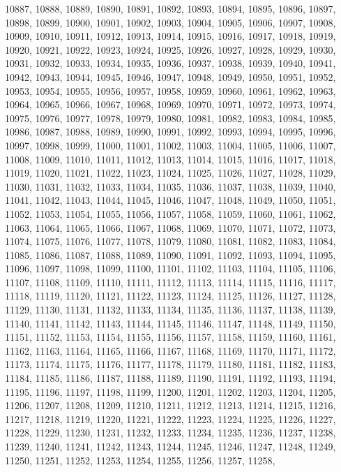 10887,
10888,
10889,
10890,
10891,
10892,
10893,
10894,
10895,
10896,
10897,
10898,
10899,
10900,
10901,
10902,
10903,
10904,
10905,
10906,
10907,
10908,
10909,
10910,
10911,
10912,
10913,
10914,
10915,
10916,
10917,
10918,
10919,
10920,
10921,
10922,
10923,
10924,
10925,
10926,
10927,
10928,
10929,
10930,
10931,
10932,
10933,
10934,
10935,
10936,
10937,
10938,
10939,
10940,
10941,
10942,
10943,
10944,
10945,
10946,
10947,
10948,
10949,
10950,
10951,
10952,
10953,
10954,
10955,
10956,
10957,
10958,
10959,
10960,
10961,
10962,
10963,
10964,
10965,
10966,
10967,
10968,
10969,
10970,
10971,
10972,
10973,
10974,
10975,
10976,
10977,
10978,
10979,
10980,
10981,
10982,
10983,
10984,
10985,
10986,
10987,
10988,
10989,
10990,
10991,
10992,
10993,
10994,
10995,
10996,
10997,
10998,
10999,
11000,
11001,
11002,
11003,
11004,
11005,
11006,
11007,
11008,
11009,
11010,
11011,
11012,
11013,
11014,
11015,
11016,
11017,
11018,
11019,
11020,
11021,
11022,
11023,
11024,
11025,
11026,
11027,
11028,
11029,
11030,
11031,
11032,
11033,
11034,
11035,
11036,
11037,
11038,
11039,
11040,
11041,
11042,
11043,
11044,
11045,
11046,
11047,
11048,
11049,
11050,
11051,
11052,
11053,
11054,
11055,
11056,
11057,
11058,
11059,
11060,
11061,
11062,
11063,
11064,
11065,
11066,
11067,
11068,
11069,
11070,
11071,
11072,
11073,
11074,
11075,
11076,
11077,
11078,
11079,
11080,
11081,
11082,
11083,
11084,
11085,
11086,
11087,
11088,
11089,
11090,
11091,
11092,
11093,
11094,
11095,
11096,
11097,
11098,
11099,
11100,
11101,
11102,
11103,
11104,
11105,
11106,
11107,
11108,
11109,
11110,
11111,
11112,
11113,
11114,
11115,
11116,
11117,
11118,
11119,
11120,
11121,
11122,
11123,
11124,
11125,
11126,
11127,
11128,
11129,
11130,
11131,
11132,
11133,
11134,
11135,
11136,
11137,
11138,
11139,
11140,
11141,
11142,
11143,
11144,
11145,
11146,
11147,
11148,
11149,
11150,
11151,
11152,
11153,
11154,
11155,
11156,
11157,
11158,
11159,
11160,
11161,
11162,
11163,
11164,
11165,
11166,
11167,
11168,
11169,
11170,
11171,
11172,
11173,
11174,
11175,
11176,
11177,
11178,
11179,
11180,
11181,
11182,
11183,
11184,
11185,
11186,
11187,
11188,
11189,
11190,
11191,
11192,
11193,
11194,
11195,
11196,
11197,
11198,
11199,
11200,
11201,
11202,
11203,
11204,
11205,
11206,
11207,
11208,
11209,
11210,
11211,
11212,
11213,
11214,
11215,
11216,
11217,
11218,
11219,
11220,
11221,
11222,
11223,
11224,
11225,
11226,
11227,
11228,
11229,
11230,
11231,
11232,
11233,
11234,
11235,
11236,
11237,
11238,
11239,
11240,
11241,
11242,
11243,
11244,
11245,
11246,
11247,
11248,
11249,
11250,
11251,
11252,
11253,
11254,
11255,
11256,
11257,
11258,
